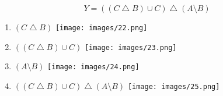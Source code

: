 \documentclass{article}
\begin{document}
\noindent\makebox[\linewidth]{\rule{\paperwidth}{0.4pt}}

$$Y = ((C \bigtriangleup B) \cup C) \bigtriangleup (A \setminus B)$$

\begin{enumerate}
    \item $(C \bigtriangleup B)$
    \texttt{[image: images/22.png]}
    
    \item $((C \bigtriangleup B) \cup C)$
    \texttt{[image: images/23.png]}
    
    \item $(A \setminus B)$
    \texttt{[image: images/24.png]}
    
    \item $((C \bigtriangleup B) \cup C) \bigtriangleup (A \setminus B)$
    \texttt{[image: images/25.png]}
\end{enumerate}

\noindent\makebox[\linewidth]{\rule{\paperwidth}{0.4pt}}
\end{document}
